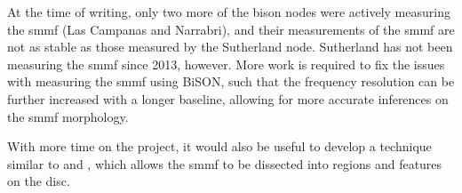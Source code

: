 At the time of writing, only two more of the \gls{bison} nodes were actively measuring the \gls{smmf} (Las Campanas and Narrabri), and their measurements of the \gls{smmf} are not as stable as those measured by the Sutherland node. Sutherland has not been measuring the \gls{smmf} since 2013, however. More work is required to fix the issues with measuring the \gls{smmf} using BiSON, such that the frequency resolution can be further increased with a longer baseline, allowing for more accurate inferences on the \gls{smmf} morphology.

With more time on the project, it would also be useful to develop a technique similar to \citet{kutsenko_contribution_2017} and \citet{bose_variability_2018}, which allows the \gls{smmf} to be dissected into regions and features on the disc.









